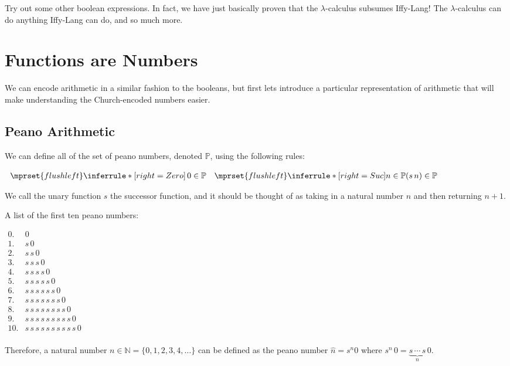 \documentclass{article}
\begin{document}
Try out some other boolean expressions.  In fact, we have just
basically proven that the $\lambda$-calculus subsumes Iffy-Lang!  The
$\lambda$-calculus can do anything Iffy-Lang can do, and so much more.

\section{Functions are Numbers}
\label{sec:functions_are_numbers}

We can encode arithmetic in a similar fashion to the booleans, but
first lets introduce a particular representation of arithmetic that
will make understanding the Church-encoded numbers easier.

\subsection{Peano Arithmetic}
\label{subsec:peano_arithmetic}
We can define all of the set of peano numbers, denoted $\mathbb{P}$, using the following rules:
\begin{center}
  \begin{math}
    \begin{array}{lll}
      $$\mprset{flushleft}
    \inferrule* [right=Zero] {
      \,
    }{0 \in \mathbb{P}}
    &
    $$\mprset{flushleft}
    \inferrule* [right=Suc] {
      n \in \mathbb{P}
    }{(s\,n) \in \mathbb{P}}
    \end{array}
  \end{math}
\end{center}
We call the unary function $s$ the successor function, and it should
be thought of as taking in a natural number $n$ and then returning
$n+1$.  

A list of the first ten peano numbers:
\begin{center}
  \begin{math}
    \begin{array}{rll}
      0. & 0\\
      1. & s\,0\\
      2. & s\,s\,0\\
      3. & s\,s\,s\,0\\
      4. & s\,s\,s\,s\,0\\
      5. & s\,s\,s\,s\,s\,0\\
      6. & s\,s\,s\,s\,s\,s\,0\\
      7. & s\,s\,s\,s\,s\,s\,s\,0\\
      8. & s\,s\,s\,s\,s\,s\,s\,s\,0\\
      9. & s\,s\,s\,s\,s\,s\,s\,s\,s\,0\\
      10.& s\,s\,s\,s\,s\,s\,s\,s\,s\,s\,0\\
    \end{array}
  \end{math}
\end{center}
Therefore, a natural number $n \in \mathbb{N} = \{0,1,2,3,4,\ldots\}$
can be defined as the peano number $\hat{n} = s^n 0$ where $s^n\,0 =
\underbrace{s\,\cdots\,s}_{n}\,0$.
\end{document}
